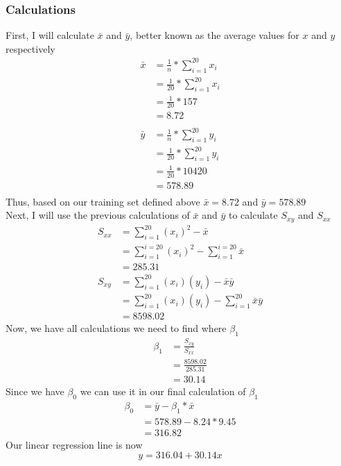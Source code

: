 \documentclass[12pt]{article}
\begin{document}
\subsubsection{Calculations}
First, I will calculate $\bar x$ and $\bar y$, better known as the average values for $x$ and $y$ respectively\\
\begin{align*}
\bar x &= \frac{1}{n} * \sum_{i=1}^{20}x_i\\
&= \frac{1}{20} * \sum_{i=1}^{20}x_i\\
&= \frac{1}{20} * 157\\
&= 8.72\\ \\
\bar y &= \frac{1}{n} * \sum_{i=1}^{20}y_i\\
&= \frac{1}{20} * \sum_{i=1}^{20}y_i\\
&= \frac{1}{20} * 10420\\
&= 578.89\\
\end{align*}
Thus, based on our training set defined above $\bar x = 8.72$ and $\bar y = 578.89$\\
Next, I will use the previous calculations of $\bar x$ and $\bar y$ to calculate $S_{xy}$ and $S_{xx}$
\begin{align*}
S_{xx} &= \sum_{i=1}^{20} (x_i)^2 - \bar x \\
&= \sum_{i=1}^{i=20} (x_i)^2 - \sum_{i=1}^{i=20} \bar x \\
&= 285.31 \\
S_{xy} &= \sum_{i=1}^{20} (x_i)(y_i) - \bar x \bar y \\
&= \sum_{i=1}^{20} (x_i)(y_i) - \sum_{i=1}^{20} \bar x \bar y \\
&= 8598.02
\end{align*}
Now, we have all calculations we need to find where $\beta_{1}$
\begin{align*}
	\beta_{1} &= \frac{S_{xy}}{S_{xx}} \\
	&= \frac{8598.02}{285.31} \\
	&= 30.14
\end{align*}
Since we have $\beta_{0}$ we can use it in our final calculation of $\beta_{1}$
\begin{align*}
	\beta_{0} &= \bar y - \beta_{1} * \bar x \\
	&= 578.89 - 8.24 * 9.45 \\
	&= 316.82
\end{align*}
Our linear regression line is now \\
\begin{equation}
	y = 316.04 + 30.14x
\end{equation}
\end{document}
